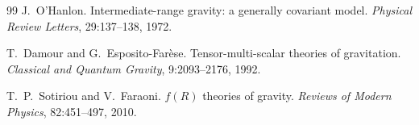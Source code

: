 \documentclass[11pt,a4paper]{article}
\theoremstyle{plain}
\theoremstyle{definition}
\theoremstyle{remark}
\begin{document}
\begin{thebibliography}{99}
J.~O'Hanlon.
\newblock Intermediate-range gravity: a generally covariant model.
\newblock \textit{Physical Review Letters}, 29:137--138, 1972.

T.~Damour and G.~Esposito-Far\`{e}se.
\newblock Tensor-multi-scalar theories of gravitation.
\newblock \textit{Classical and Quantum Gravity}, 9:2093--2176, 1992.

T.~P.~Sotiriou and V.~Faraoni.
\newblock $f(R)$ theories of gravity.
\newblock \textit{Reviews of Modern Physics}, 82:451--497, 2010.

\end{thebibliography}
\end{document}
